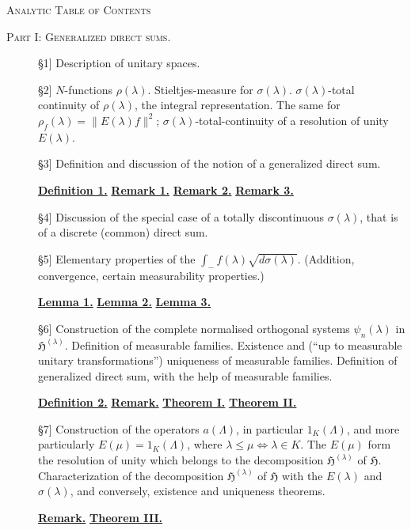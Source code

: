 \documentclass[b5paper,12pt,twoside]{article}
\numberwithin{equation}{section}
\theoremstyle{vnplain}
\theoremstyle{vndefinition}
\newcommand{\tocsec}[1]{\hyperref[sec:#1]{\S#1}}
\begin{document}
\begin{center}
  {\large\scshape Analytic Table of Contents}
\end{center}

\noindent\textsc{Part I: Generalized direct sums.}
\begin{description}
\item[\tocsec{1}] Description of unitary spaces.
\item[\tocsec{2}] $N$-functions $\rho(\lambda)$. Stieltjes-measure
for $\sigma(\lambda)$. $\sigma(\lambda)$-total continuity of $\rho(\lambda)$,
the integral representation. The same for
$\rho_f(\lambda)=\lVert E(\lambda)f\rVert^2$;
$\sigma(\lambda)$-total-continuity of a resolution of unity $E(\lambda)$.
\item[\tocsec{3}] Definition and discussion of the notion of a
generalized direct sum.
\begin{center}\hyperref[def:1]{\textbf{Definition 1.}}\quad
\hyperref[rem:3.1]{\textbf{Remark 1.}}\quad
\hyperref[rem:3.2]{\textbf{Remark 2.}}\quad
\hyperref[rem:3.3]{\textbf{Remark 3.}}\end{center}
\item[\tocsec{4}] Discussion of the special case of a totally
discontinuous $\sigma(\lambda)$, that is of a discrete (common) direct sum.
\item[\tocsec{5}] Elementary properties of the
$\displaystyle\int_{-} f(\lambda)\sqrt{d\sigma(\lambda)}$.
(Addition, convergence, certain measurability properties.)
\begin{center}\hyperref[lem:1]{\textbf{Lemma 1.}}\quad
\hyperref[lem:2]{\textbf{Lemma 2.}}\quad
\hyperref[lem:3]{\textbf{Lemma 3.}}\end{center}
\item[\tocsec{6}] Construction of the complete normalised orthogonal
systems $\psi_n(\lambda)$ in $\mathfrak H^{(\lambda)}$. Definition of
measurable families. Existence and (``up to measurable unitary
transformations'') uniqueness of measurable families. Definition of
generalized direct sum, with the help of measurable families.
\begin{center}\hyperref[def:2]{\textbf{Definition 2.}}\quad
\hyperref[rem:6.1]{\textbf{Remark.}}\quad
\hyperref[thm:I]{\textbf{Theorem I.}}\quad
\hyperref[thm:II]{\textbf{Theorem II.}}\end{center}
\item[\tocsec{7}] Construction of the operators $a(\Lambda)$, in
particular $1_K(\Lambda)$, and more particularly
$E(\mu)=1_K(\Lambda)$, where $\lambda\leq\mu\Longleftrightarrow\lambda\in K$.
The $E(\mu)$ form the resolution of unity which belongs to the decomposition
$\mathfrak H^{(\lambda)}$ of $\mathfrak H$. Characterization of the
decomposition $\mathfrak H^{(\lambda)}$ of $\mathfrak H$ with the $E(\lambda)$
and $\sigma(\lambda)$, and conversely, existence and uniqueness theorems.
\begin{center}\hyperref[rem:7.1]{\textbf{Remark.}}\quad
\hyperref[thm:III]{\textbf{Theorem III.}}\end{center}
\end{description}
\end{document}
